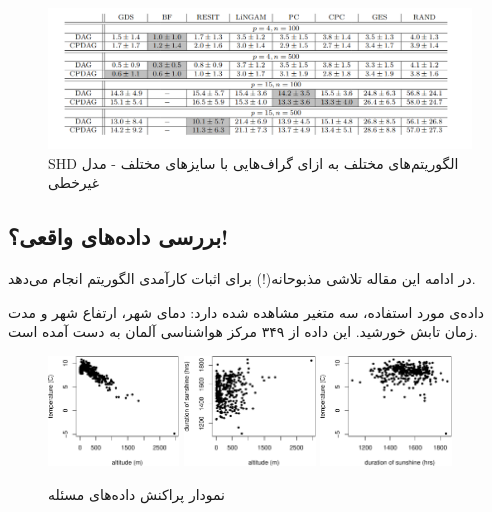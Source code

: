 \documentclass[a4paper,12pt]{article}
\begin{document}
\begin{figure}[h!]
\centering
\includegraphics[scale=0.42]{dif.png}
	\caption{SHD
	الگوریتم‌های مختلف به ازای گراف‌هایی با سایز‌های مختلف	 - مدل غیرخطی
}
\end{figure}

\subsection{بررسی داده‌های واقعی؟!}
در ادامه این مقاله تلاشی مذبوحانه(!) برای اثبات کارآمدی الگوریتم 
انجام می‌دهد.

داده‌ی مورد استفاده، سه متغیر‌ مشاهده شده دارد: دمای شهر، ارتفاع شهر و مدت زمان تابش خورشید. این داده از ۳۴۹ مرکز هواشناسی آلمان به دست آمده است.
\begin{figure}[h!]
	\begin{center}
		\includegraphics[width=0.31\textwidth]{experimentAltTempcut}
		\hspace{0.02\textwidth}
		\includegraphics[width=0.31\textwidth]{experimentAltSuncut}
		\hspace{0.02\textwidth}
		\includegraphics[width=0.31\textwidth]{experimentSunTempcut}
	\end{center}
	\caption{نمودار پراکنش داده‌های مسئله}
	\label{fig:alt}
\end{figure}
\end{document}
